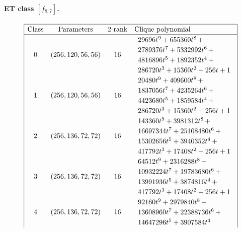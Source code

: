 \documentclass[12pt,a4paper]{article}
\begin{document}
\paragraph*{ET class $[f_{8,7}]$.}
%
\begin{table}[!bhpt] %
\small{}
\begin{align*}
\def\arraystretch{1.2}
\begin{array}{|cccl|}
\hline
\text{Class} &
\text{Parameters} &
\text{2-rank} &
\text{Clique polynomial}
\\
\hline
0 &
(256, 120, 56, 56) &
16 &
\begin{array}{l}
29696t^{9} + 655360t^{8}
\,+
\\
 2789376t^{7} + 5332992t^{6}
\,+
\\
 4816896t^{5} + 1892352t^{4}
\,+
\\
 286720t^{3} + 15360t^{2} + 256t + 1
\end{array}
\\
1 &
(256, 120, 56, 56) &
16 &
\begin{array}{l}
20480t^{9} + 409600t^{8}
\,+
\\
 1837056t^{7} + 4235264t^{6}
\,+
\\
 4423680t^{5} + 1859584t^{4}
\,+
\\
 286720t^{3} + 15360t^{2} + 256t + 1
\end{array}
\\
2 &
(256, 136, 72, 72) &
16 &
\begin{array}{l}
143360t^{9} + 3981312t^{8}
\,+
\\
 16697344t^{7} + 25108480t^{6}
\,+
\\
 15302656t^{5} + 3940352t^{4}
\,+
\\
 417792t^{3} + 17408t^{2} + 256t + 1
\end{array}
\\
3 &
(256, 136, 72, 72) &
16 &
\begin{array}{l}
64512t^{9} + 2316288t^{8}
\,+
\\
 10932224t^{7} + 19783680t^{6}
\,+
\\
 13991936t^{5} + 3874816t^{4}
\,+
\\
 417792t^{3} + 17408t^{2} + 256t + 1
\end{array}
\\
4 &
(256, 136, 72, 72) &
16 &
\begin{array}{l}
92160t^{9} + 2979840t^{8}
\,+
\\
 13608960t^{7} + 22388736t^{6}
\,+
\\
 14647296t^{5} + 3907584t^{4}

\end{array}
\end{array}
\end{align*}
\end{table}
\end{document}

